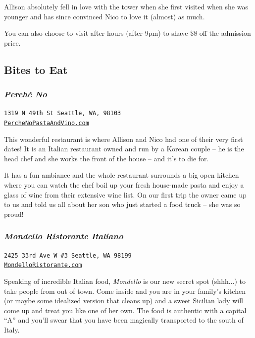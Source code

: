 \documentclass[10pt]{article}
\begin{document}
Allison absolutely fell in love with the tower when she first visited when she was younger
and has since convinced Nico to love it (almost) as much.

You can also choose to visit after hours (after 9pm) to shave \$8 off the admission price.

\newpage
\noindent\hrulefill

\subsection{Bites to Eat}
\label{subsec-bites}

\subsubsection{\textit{Perch\'e No}}
\begin{center}
    \texttt{1319 N 49th St Seattle, WA, 98103\\\href{https://www.perchenopastaandvino.com/}{PercheNoPastaAndVino.com}}
\end{center}
This wonderful restaurant is where Allison and Nico had one of their very first dates!
It is an Italian restaurant owned and run by a Korean couple -- he is the head chef and 
she works the front of the house -- and it's to die for. 

It has a fun ambiance and the whole restaurant surrounds a big open kitchen where you can 
watch the chef boil up your fresh house-made pasta and enjoy a glass of wine from their 
extensive wine list. On our first trip the owner came up to us and told us all about her son 
who just started a food truck -- she was so proud!

\subsubsection{\textit{Mondello Ristorante Italiano}}
\begin{center}
    \texttt{2425 33rd Ave W \#3 Seattle, WA 98199\\\href{http://www.mondelloristorante.com/}{MondelloRistorante.com}}
\end{center}
Speaking of incredible Italian food, \textit{Mondello} is our new secret spot (shhh...) 
to take people from out of town. Come inside and you are in your family's kitchen (or 
maybe some idealized version that cleans up) and a sweet Sicilian lady will come up and
treat you like one of her own. The food is authentic with a capital ``A'' and you'll 
swear that you have been magically transported to the south of Italy.
\end{document}
